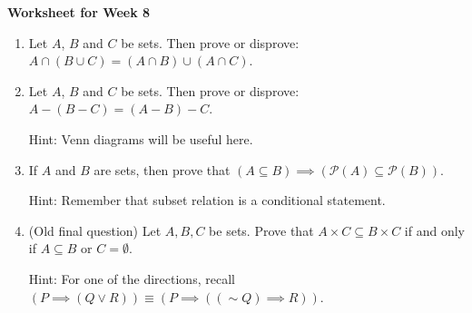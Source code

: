 \documentclass[12pt]{article}
\renewcommand{\neg}{\sim}
\begin{document}
\centerline{\bf\large Worksheet for Week 8}

\vspace{25pt}



\begin{enumerate}

\item Let $A$, $B$ and $C$ be sets. Then prove or disprove: $A\cap (B\cup C)=(A\cap B)\cup (A\cap C)$.

%
% 
% 
% 

\item Let $A$, $B$ and $C$ be sets. Then prove or disprove: $A-(B-C)=(A-B)-C$.

Hint: Venn diagrams will be useful here.

\item If $A$ and $B$ are sets, then prove that $(A\subseteq B)\implies (\mathcal P(A)\subseteq \mathcal P(B))$.

Hint: Remember that subset relation is a conditional statement.

\item (Old final question) Let $A,B,C$ be sets. Prove that $A\times C\subseteq B\times C$ if and only if $A\subseteq B$ or $C=\emptyset$.

Hint: For one of the directions, recall $\left(P\implies (Q\lor R)\right)\equiv \left(P\implies ((\neg Q)\implies R)\right)$.


\end{enumerate}
\end{document}

